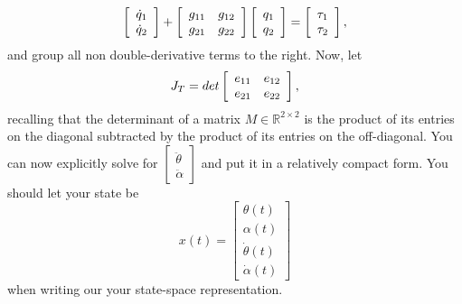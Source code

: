 \documentclass[12pt]{report}
\newcommand\drew[1]{\textcolor{red}{#1}}
\begin{document}
\begin{enumerate}
\[              \left[\begin{array}{c}
                      \dot{q}_{1} \\
                      \dot{q}_{2}
                  \end{array}\right] +
              \left[\begin{array}{c c}
                      g_{11} & g_{12} \\
                      g_{21} & g_{22}
                  \end{array}\right]
              \left[\begin{array}{c}
                      q_{1} \\
                      q_{2}
                  \end{array}\right] =
              \left[\begin{array}{c}
                      \tau_1 \\
                      \tau_2
                  \end{array}\right],
          \]
          and group all non double-derivative terms to the right. Now, let
          \[J_T = det
              \left[\begin{array}{c c}
                      e_{11} & e_{12} \\
                      e_{21} & e_{22}
                  \end{array}\right],
          \]
          recalling that the determinant of a matrix $M \in \mathbb{R}^{2\times2}$ is the product of its entries on the diagonal subtracted by the product of its entries on the off-diagonal. You can now explicitly solve for $\left[\begin{array}{c}
                      \ddot{\theta} \\
                      \ddot{\alpha}
                  \end{array}\right]$ and put it in a relatively compact form. You should let your state be
          \[
              x(t) =
              \left[\begin{array}{c}
                      \theta(t)       \\
                      \alpha(t)       \\
                      \dot{\theta}(t) \\
                      \dot{\alpha}(t)
                  \end{array}\right]
          \]
          when writing our your state-space representation.\\

\end{enumerate}
\end{document}
